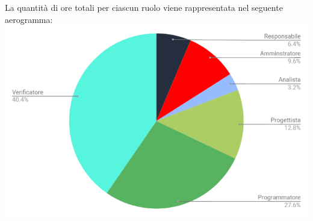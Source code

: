 \vskip 30pt %
\newpage
La quantità di ore totali per ciascun ruolo viene rappresentata nel seguente aerogramma:\\
\includegraphics[width=1\textwidth]{./src/Preventivo/src/img/TortaValidazione.png}
